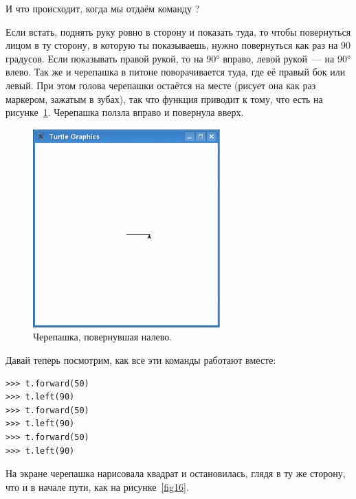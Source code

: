 И что происходит, когда мы отдаём команду ?

Если встать, поднять руку ровно в сторону и показать туда, то чтобы повернуться лицом в ту сторону, в которую ты показываешь, нужно повернуться как раз на 90 градусов. Если показывать правой рукой, то на 90° вправо, левой рукой — на 90° влево. Так же и черепашка в питоне поворачивается туда, где её правый бок или левый. При этом голова черепашки остаётся на месте (рисует она как раз маркером, зажатым в зубах), так что функция  приводит к тому, что есть на рисунке \ref{fig15}. Черепашка ползла вправо и повернула вверх.

\begin{figure}
\begin{center}
\includegraphics[width=72mm]{../en/figure15.eps}
\end{center}
\caption{Черепашка, повернувшая налево.}\label{fig15}
\end{figure}

Давай теперь посмотрим, как все эти команды работают вместе:

\begin{listing}
\begin{verbatim}
>>> t.forward(50)
>>> t.left(90)
>>> t.forward(50)
>>> t.left(90)
>>> t.forward(50)
>>> t.left(90)
\end{verbatim}
\end{listing}

На экране черепашка нарисовала квадрат и остановилась, глядя в ту же сторону, что и в начале пути, как на рисунке \ref{fig16}.


